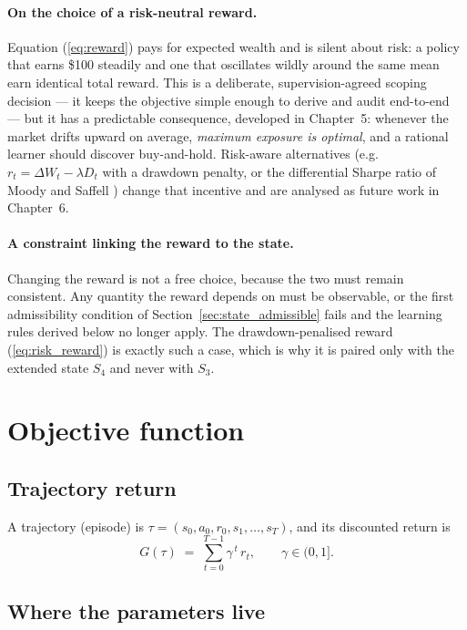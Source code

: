 \paragraph{On the choice of a risk-neutral reward.} Equation
(\ref{eq:reward}) pays for expected wealth and is silent about risk: a
policy that earns \$100 steadily and one that oscillates wildly around
the same mean earn identical total reward. This is a deliberate,
supervision-agreed scoping decision --- it keeps the objective simple
enough to derive and audit end-to-end --- but it has a predictable
consequence, developed in Chapter~5: whenever the market drifts upward on
average, \emph{maximum exposure is optimal}, and a rational learner
should discover buy-and-hold. Risk-aware alternatives (e.g.\
$r_t = \Delta W_t - \lambda D_t$ with a drawdown penalty, or the
differential Sharpe ratio of Moody and Saffell \cite{moody2001}) change
that incentive and are analysed as future work in Chapter~6.

\paragraph{A constraint linking the reward to the state.} Changing the
reward is not a free choice, because the two must remain consistent. Any
quantity the reward depends on must be observable, or the first
admissibility condition of Section~\ref{sec:state_admissible} fails and
the learning rules derived below no longer apply. The drawdown-penalised
reward (\ref{eq:risk_reward}) is exactly such a case, which is why it is
paired only with the extended state $S_4$ and never with $S_3$.

\section{Objective function}
\label{sec:objective}

\subsection{Trajectory return}

A trajectory (episode) is
$\tau = (s_0, a_0, r_0, s_1, \dots, s_T)$, and its discounted return is
\begin{equation}
G(\tau) \;=\; \sum_{t=0}^{T-1} \gamma^{\,t}\, r_t ,
\qquad \gamma \in (0,1].
\label{eq:return}
\end{equation}

\subsection{Where the parameters live}

